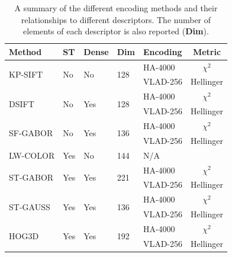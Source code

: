 \begin{table}

\small
\centering
    \begin{tabular}{l p{0.5cm} p{0.9cm} p{0.5cm} p{2.5cm} c }
    \hline
    \textbf{Method}              & \textbf{ST} & \textbf{Dense} & \textbf{Dim}  & \textbf{Encoding}      & \textbf{Metric}    \\ \hline
    \multirow{2}{*}{KP-SIFT} & \multirow{2}{*}{No} & \multirow{2}{*}{No} & \multirow{2}{*}{128}     & HA-4000  &   $\chi^2$    \\ \cline{5-6} 
        ~                   & ~      & ~           & ~      & VLAD-256 & Hellinger \\ \hline
    \multirow{2}{*}{DSIFT} & \multirow{2}{*}{No} & \multirow{2}{*}{Yes} & \multirow{2}{*}{128}     & HA-4000  &   $\chi^2$    \\ \cline{5-6}
    ~                   & ~      & ~           & ~      & VLAD-256 & Hellinger \\ \hline
    \multirow{2}{*}{SF-GABOR} & \multirow{2}{*}{No}               & \multirow{2}{*}{Yes}  & \multirow{2}{*}{136}  & HA-4000  & $\chi^2$      \\  \cline{5-6}
    ~                   & ~      & ~           & ~      & VLAD-256 & Hellinger \\ \hline
    LW-COLOR           & Yes & No & 144           & N/A       \\ \hline
    \multirow{2}{*}{ST-GABOR}          & \multirow{2}{*}{Yes}              & \multirow{2}{*}{Yes}  & \multirow{2}{*}{221}  & HA-4000  & $\chi^2$      \\  \cline{5-6}
    ~                   & ~      & ~           & ~      & VLAD-256 & Hellinger \\ \hline
    \multirow{2}{*}{ST-GAUSS}           & \multirow{2}{*}{Yes}              & \multirow{2}{*}{Yes}  & \multirow{2}{*}{136}  & HA-4000  & $\chi^2$      \\  \cline{5-6}
    ~                   & ~      & ~           & ~      & VLAD-256 & Hellinger \\ \hline
    \multirow{2}{*}{HOG3D}               & \multirow{2}{*}{Yes}              & \multirow{2}{*}{Yes} & \multirow{2}{*}{192}   &  HA-4000  & $\chi^2$      \\  \cline{5-6}
    ~                   & ~       & ~          & ~      & VLAD-256 & Hellinger \\ \hline
    \end{tabular}
    \normalsize
    
    \caption{A summary of the different encoding methods and their relationships to different descriptors. The number of elements of each descriptor is also reported (\textbf{Dim}).}
\label{tbl:Methods}
\end{table}


